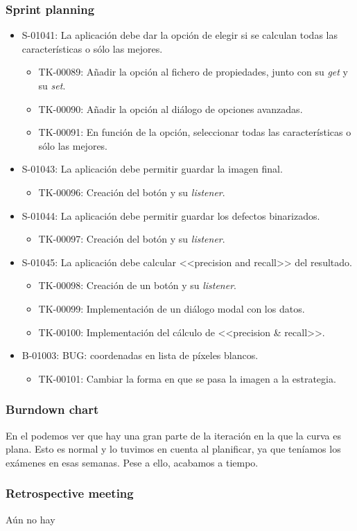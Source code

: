\subsubsection*{Sprint planning}
\begin{itemize}
 \item S-01041: La aplicación debe dar la opción de elegir si se calculan todas las características o sólo las mejores.
  \begin{itemize}
   \item TK-00089: Añadir la opción al fichero de propiedades, junto con su \emph{get} y su \emph{set}.
   \item TK-00090: Añadir la opción al diálogo de opciones avanzadas.
   \item TK-00091: En función de la opción, seleccionar todas las características o sólo las mejores.
  \end{itemize}
 \item S-01043: La aplicación debe permitir guardar la imagen final.
  \begin{itemize}
   \item TK-00096: Creación del botón y su \textit{listener}.
  \end{itemize}
  \item S-01044: La aplicación debe permitir guardar los defectos binarizados.
  \begin{itemize}
   \item TK-00097: Creación del botón y su \textit{listener}.
  \end{itemize}
  \item S-01045: La aplicación debe calcular <<precision and recall>> del resultado.
  \begin{itemize}
   \item TK-00098: Creación de un botón y su \textit{listener}.
   \item TK-00099: Implementación de un diálogo modal con los datos.
   \item TK-00100: Implementación del cálculo de <<precision \& recall>>.
  \end{itemize}
 \item B-01003: BUG: coordenadas en lista de píxeles blancos.
  \begin{itemize}
   \item TK-00101: Cambiar la forma en que se pasa la imagen a la estrategia.
  \end{itemize}
\end{itemize}


\subsubsection*{Burndown chart}
En el \burndownchart{}  podemos ver que hay una gran parte de la iteración en la que la curva es plana. Esto es normal y lo tuvimos en cuenta al planificar, ya que teníamos los exámenes en esas semanas. Pese a ello, acabamos a tiempo.



\subsubsection*{Retrospective meeting}
Aún no hay

